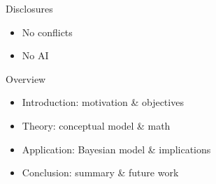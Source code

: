\begin{frame}{Disclosures}
  \begin{itemize}
    \item No conflicts
    \item No AI
  \end{itemize}
\end{frame}
\begin{frame}{Overview}
  \begin{itemize}
    \item Introduction: motivation \& objectives
    \item Theory: conceptual model \& math
    \item Application: Bayesian model \& implications
    \item Conclusion: summary \& future work
  \end{itemize}
\end{frame}
